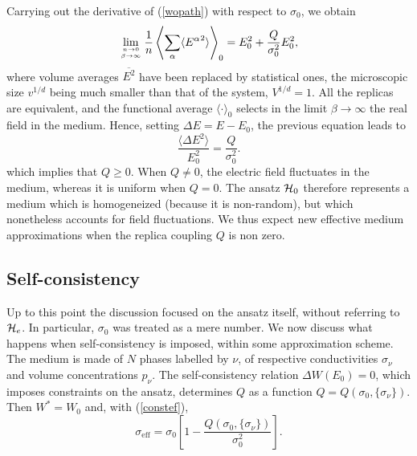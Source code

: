 Carrying out the derivative of (\ref{wopath}) 
with respect to $\sigma_0$, we obtain
\begin{equation}
\lim_{n\to 0\atop \beta\to\infty}\frac{1}{n}\left\langle\sum_\alpha
\langle{E^\alpha}^2\rangle\right\rangle_0=E_0^2+ \frac{Q}{\sigma_0^2}
E_0^2,
\end{equation}
where volume averages $\overline{E^2}$ have been replaced by statistical 
ones, the microscopic size $v^{1/d}$ being much smaller than 
that of the system, $V^{1/d}=1$.
All the replicas are equivalent, and the functional average $\langle\cdot\rangle_0$ selects in the limit $\beta\to\infty$ the real 
field in the medium. Hence, setting $\Delta E=E-E_0$, the previous 
equation leads to
\begin{equation}
\label{qq}
\frac{\langle\Delta E^2\rangle}{E_0^2}=\frac{Q}{\sigma_0^2}.
\end{equation}
which implies that $Q\geq 0$. When $Q\not=0$, the electric field
fluctuates in the medium, whereas it is uniform when $Q=0$. The ansatz
${\cal H}_0$ therefore represents a medium which is homogeneized
(because it is non-random), but which nonetheless
accounts for field fluctuations. 
We thus expect new effective medium approximations
when the replica coupling $Q$ is non zero.

\subsection{Self-consistency}
\label{sc}
Up to this point the discussion focused on the ansatz itself, without 
referring to ${\cal H}_e$. In particular, $\sigma_0$ was treated as a 
mere number. We now discuss what happens when self-consistency is 
imposed, within some approximation scheme. The medium is made of $N$ 
phases labelled by $\nu$, of respective conductivities $\sigma_\nu$ 
and volume concentrations $p_\nu$. The self-consistency relation 
$\Delta W(E_0)=0$, which imposes constraints on the ansatz, 
determines $Q$ as a function $Q=Q(\sigma_0,\{\sigma_\nu\})$. 
Then $W^*=W_0$ and, with (\ref{constef}),
\begin{equation}
\label{sigeff}
\sigma_{\text{eff}}=\sigma_0\left[1-\frac{Q(\sigma_0,\{\sigma_\nu\})}
{\sigma_0^2}\right].
\end{equation}

